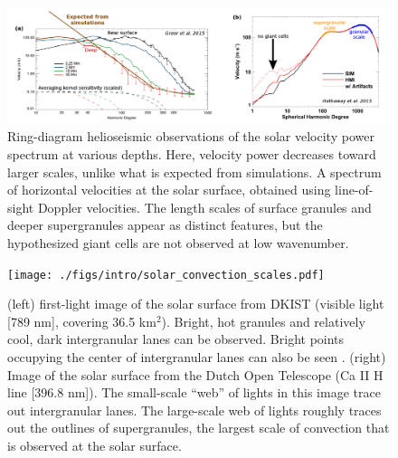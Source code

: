 \begin{figure}[ht!]
\includegraphics[width=\textwidth]{./figs/intro/conv_conundrum.pdf}
\caption[Solar velocity power spectra.]
{
	\citep[a, annoted Fig.~3 from][]{greer&all2015} Ring-diagram helioseismic observations of the solar velocity power spectrum at various depths.
	Here, velocity power decreases toward larger scales, unlike what is expected from simulations.
	\citep[b, annotated Fig.~8 from][]{hathaway&all2015} A spectrum of horizontal velocities at the solar surface, obtained using line-of-sight Doppler velocities.
	The length scales of surface granules and deeper supergranules appear as distinct features, but the hypothesized giant cells are not observed at low wavenumber.
	\label{fig:conv_conundrum} 
}
\end{figure}

\begin{figure}[ht!]
\texttt{[image: ./figs/intro/solar\_convection\_scales.pdf]}
\caption[Solar velocity power spectra.]
{
	(left) first-light image of the solar surface from DKIST (visible light [789 nm], covering 36.5 km$^2$).
	Bright, hot granules and relatively cool, dark intergranular lanes can be observed.
	Bright points occupying the center of intergranular lanes can also be seen \citep{vankooten&cranmer2017}.
	(right) Image of the solar surface from the Dutch Open Telescope (Ca II H line [396.8 nm]).
	The small-scale ``web'' of lights in this image trace out intergranular lanes.
	The large-scale web of lights roughly traces out the outlines of supergranules, the largest scale of convection that is observed at the solar surface.
	\label{fig:solar_convection_scales} 
}
\end{figure}

